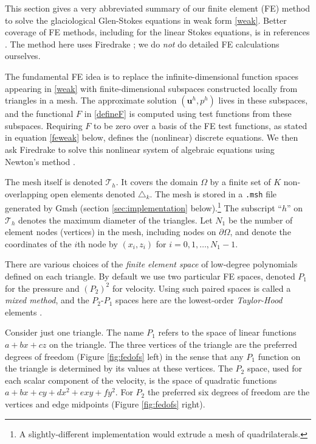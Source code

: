 \documentclass[letterpaper,final,12pt,reqno]{amsart}
\newcommand{\bu}{\mathbf{u}}
\begin{document}
This section gives a very abbreviated summary of our finite element (FE) method to solve the glaciological Glen-Stokes equations in weak form \eqref{weak}.  Better coverage of FE methods, including for the linear Stokes equations, is in references \cite{Braess2007,Bueler2021,Elmanetal2014}.  The method here uses Firedrake \cite{Rathgeberetal2016}; we do \emph{not} do detailed FE calculations ourselves.

The fundamental FE idea is to replace the infinite-dimensional function spaces appearing in \eqref{weak} with finite-dimensional subspaces constructed locally from triangles in a mesh.  The approximate solution $(\bu^h,p^h)$ lives in these subspaces, and the functional $F$ in \eqref{defineF} is computed using test functions from these subspaces.  Requiring $F$ to be zero over a basis of the FE test functions, as stated in equation \eqref{feweak} below, defines the (nonlinear) discrete equations.  We then ask Firedrake to solve this nonlinear system of algebraic equations using Newton's method \cite{Bueler2021}.

The mesh itself is denoted $\mathcal{T}_h$.  It covers the domain $\Omega$ by a finite set of $K$ non-overlapping open elements denoted $\triangle_k$.  The mesh is stored in a \texttt{.msh} file generated by Gmsh (section \ref{sec:implementation} below).\footnote{A slightly-different implementation would extrude a mesh of quadrilaterals.}  The subscript ``$h$'' on $\mathcal{T}_h$ denotes the maximum diameter of the triangles.  Let $N_1$ be the number of element nodes (vertices) in the mesh, including nodes on $\partial\Omega$, and denote the coordinates of the $i$th node by $(x_i,z_i)$ for $i=0,1,\dots,N_1-1$.

There are various choices of the \emph{finite element space} of low-degree polynomials defined on each triangle.  By default we use two particular FE spaces, denoted $P_1$ for the pressure and $(P_2)^2$ for velocity.  Using such paired spaces is called a \emph{mixed method}, and the $P_2$-$P_1$ spaces here are the lowest-order \emph{Taylor-Hood} elements \cite{Elmanetal2014}.

Consider just one triangle.  The name $P_1$ refers to the space of linear functions $a + b x + c z$ on the triangle.  The three vertices of the triangle are the preferred degrees of freedom (Figure \ref{fig:fedofs} left) in the sense that any $P_1$ function on the triangle is determined by its values at these vertices.  The $P_2$ space, used for each scalar component of the velocity, is the space of quadratic functions $a + bx + cy + dx^2 + exy + fy^2$.  For $P_2$ the preferred six degrees of freedom are the vertices and edge midpoints (Figure \ref{fig:fedofs} right).
\end{document}
